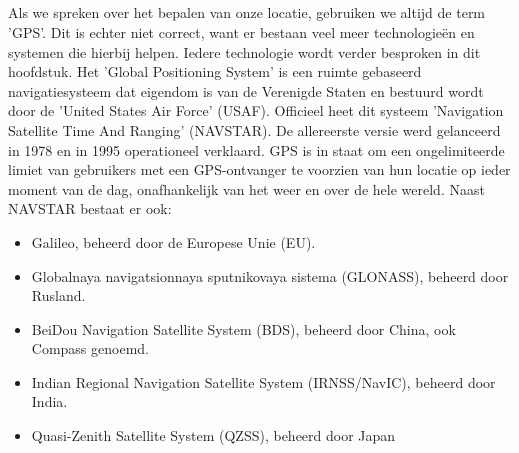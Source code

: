 \subsection{}
Als we spreken over het bepalen van onze locatie, gebruiken we altijd de term 'GPS'. Dit is echter niet correct, want er bestaan veel meer technologieën en systemen die hierbij helpen. Iedere technologie wordt verder besproken in dit hoofdstuk.
\newline
Het 'Global Positioning System' is een ruimte gebaseerd navigatiesysteem dat eigendom is van de Verenigde Staten en bestuurd wordt door de 'United States Air Force' (USAF). Officieel heet dit systeem 'Navigation Satellite Time And Ranging' (NAVSTAR). De allereerste versie werd gelanceerd in 1978 en in 1995 operationeel verklaard. GPS is in staat om een ongelimiteerde limiet van gebruikers met een GPS-ontvanger te voorzien van hun locatie op ieder moment van de dag, onafhankelijk van het weer en over de hele wereld. \autocite{gps}
\newline
Naast NAVSTAR bestaat er ook:
\begin{itemize}
	\item Galileo, beheerd door de Europese Unie (EU).
	\item Globalnaya navigatsionnaya sputnikovaya sistema (GLONASS), beheerd door Rusland.
	\item BeiDou Navigation Satellite System (BDS), beheerd door China, ook Compass genoemd.
	\item Indian Regional Navigation Satellite System (IRNSS/NavIC), beheerd door India.
	\item Quasi-Zenith Satellite System (QZSS), beheerd door Japan
\end{itemize}

